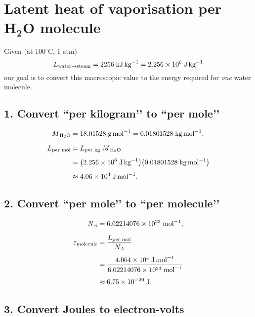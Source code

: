 \documentclass[12pt]{article}
\title{}
\author{Jerich Lee}
\date{\today}
\theoremstyle{definition} %
\theoremstyle{plain} %
\begin{document}
\maketitle

\section*{Latent heat of vaporisation per \(\mathbf{H_2O}\) molecule}

Given (at \(100^{\circ}\mathrm{C},\,1\;\text{atm}\))  
\[
  L_{\text{water}\to\text{steam}}
  = 2256\;\text{kJ\,kg}^{-1}
  = 2.256\times10^{6}\;\text{J\,kg}^{-1}
\]
our goal is to convert this macroscopic value to the energy required for
\emph{one} water molecule.

\subsection*{1.  Convert “per kilogram’’ to “per mole’’}

\[
  \begin{aligned}
    M_{\,\mathrm{H_2O}}
    &= 18.01528\;\text{g\,mol}^{-1}
      = 0.01801528\;\text{kg\,mol}^{-1}, \\[6pt]
    L_{\text{per mol}}
    &= L_{\text{per kg}}\;M_{\,\mathrm{H_2O}} \\[4pt]
    &= \bigl(2.256\times10^{6}\;\text{J\,kg}^{-1}\bigr)
       \bigl(0.01801528\;\text{kg\,mol}^{-1}\bigr) \\[4pt]
    &\approx 4.06\times10^{4}\;\text{J\,mol}^{-1}.
  \end{aligned}
\]

\subsection*{2.  Convert “per mole’’ to “per molecule’’}

\[
  \begin{aligned}
    N_A &= 6.02214076\times10^{23}\;\text{mol}^{-1}, \\[6pt]
    \varepsilon_{\text{molecule}}
    &= \frac{L_{\text{per mol}}}{N_A} \\[4pt]
    &= \frac{4.064\times10^{4}\;\text{J\,mol}^{-1}}
            {6.02214076\times10^{23}\;\text{mol}^{-1}} \\[4pt]
    &\approx 6.75\times10^{-20}\;\text{J}.
  \end{aligned}
\]

\subsection*{3.  Convert Joules to electron-volts}
\end{document}
